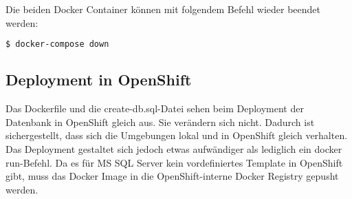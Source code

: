 Die beiden Docker Container können mit folgendem Befehl wieder beendet werden:
\begin{lstlisting}[language=bash]
	$ docker-compose down
\end{lstlisting}

\subsection{Deployment in OpenShift}
Das Dockerfile und die create-db.sql-Datei sehen beim Deployment der Datenbank in OpenShift gleich aus. Sie verändern sich nicht. Dadurch ist sichergestellt, dass sich die Umgebungen lokal und in OpenShift gleich verhalten. Das Deployment gestaltet sich jedoch etwas aufwändiger als lediglich ein \glqq docker run\grqq-Befehl. Da es für MS SQL Server kein vordefiniertes Template in OpenShift gibt, muss das Docker Image in die OpenShift-interne Docker Registry gepusht werden.

